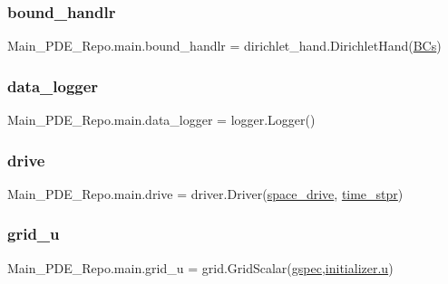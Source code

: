 \subsubsection{\texorpdfstring{bound\+\_\+handlr}{bound\_handlr}}
{\footnotesize\ttfamily Main\+\_\+\+P\+D\+E\+\_\+\+Repo.\+main.\+bound\+\_\+handlr = dirichlet\+\_\+hand.\+Dirichlet\+Hand(\hyperlink{namespaceMain__PDE__Repo_1_1main_a19c90e7effeaf1735a2fb466eedd5a1c}{B\+Cs})}

\mbox{\label{namespaceMain__PDE__Repo_1_1main_af6467b085d01bd160fc83b50e93c0e54}} 
\subsubsection{\texorpdfstring{data\+\_\+logger}{data\_logger}}
{\footnotesize\ttfamily Main\+\_\+\+P\+D\+E\+\_\+\+Repo.\+main.\+data\+\_\+logger = logger.\+Logger()}

\mbox{\label{namespaceMain__PDE__Repo_1_1main_a9ef42bd76559c7db058c155f447f124b}} 
\subsubsection{\texorpdfstring{drive}{drive}}
{\footnotesize\ttfamily Main\+\_\+\+P\+D\+E\+\_\+\+Repo.\+main.\+drive = driver.\+Driver(\hyperlink{namespaceMain__PDE__Repo_1_1main_a9450a1548e6c8d9316ce9ef5b053883e}{space\+\_\+drive}, \hyperlink{namespaceMain__PDE__Repo_1_1main_a87fde87043b4ff2798a7802cb61a3cbc}{time\+\_\+stpr})}

\mbox{\label{namespaceMain__PDE__Repo_1_1main_afcaceac73c84e6cc9ab24693d873b0cd}} 
\subsubsection{\texorpdfstring{grid\+\_\+u}{grid\_u}}
{\footnotesize\ttfamily Main\+\_\+\+P\+D\+E\+\_\+\+Repo.\+main.\+grid\+\_\+u = grid.\+Grid\+Scalar(\hyperlink{namespaceMain__PDE__Repo_1_1main_a93cc028e2fb81f534086f1b63fe78718}{gspec},\hyperlink{namespaceMain__PDE__Repo_1_1initializer_af0ec17a2fbde89969e4c442f9f4fda75}{initializer.\+u})}

